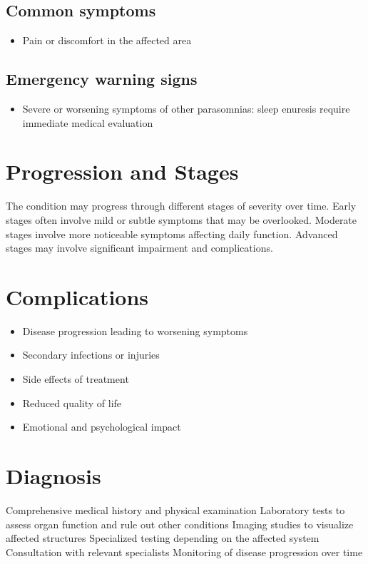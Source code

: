 \subsection{Common symptoms}
\begin{itemize}[noitemsep]
  \item Pain or discomfort in the affected area
  \end{itemize}

\subsection{Emergency warning signs}
\begin{itemize}[noitemsep]
  \item Severe or worsening symptoms of other parasomnias: sleep enuresis require immediate medical evaluation
\end{itemize}
\section{Progression and Stages}
The condition may progress through different stages of severity over time. Early stages often involve mild or subtle symptoms that may be overlooked. Moderate stages involve more noticeable symptoms affecting daily function. Advanced stages may involve significant impairment and complications.
\section{Complications}
\begin{itemize}[noitemsep]
  \item Disease progression leading to worsening symptoms
  \item Secondary infections or injuries
  \item Side effects of treatment
  \item Reduced quality of life
  \item Emotional and psychological impact
\end{itemize}
\section{Diagnosis}
Comprehensive medical history and physical examination Laboratory tests to assess organ function and rule out other conditions Imaging studies to visualize affected structures Specialized testing depending on the affected system Consultation with relevant specialists Monitoring of disease progression over time

